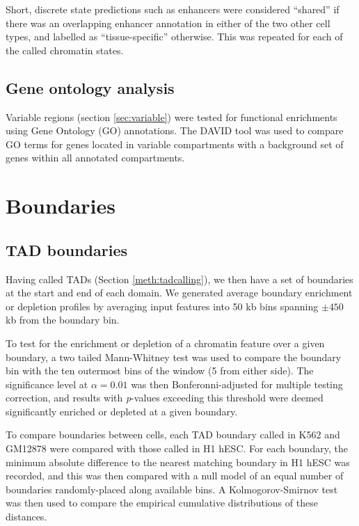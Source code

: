 \documentclass[a4paper,11pt,oneside]{book}
\begin{document}
Short, discrete state predictions such as enhancers were
considered ``shared'' if there was an overlapping enhancer annotation in
either of the two other cell types, and labelled as ``tissue-specific''
otherwise. This was repeated for each of the called chromatin states.

\subsection{Gene ontology analysis}

Variable regions (section \ref{sec:variable}) were tested for functional enrichments using Gene Ontology (GO) annotations.\cite{Ashburner2000} The DAVID tool\cite{Huang2008} was used to compare GO terms for genes located in variable compartments with a background set of genes within all annotated compartments.


\section{Boundaries}\label{boundaries}

\subsection{TAD boundaries}\label{meth:tadbounds}

Having called TADs (Section \ref{meth:tadcalling}), we then have a set of boundaries at the start and end of each domain. We generated average boundary enrichment or depletion profiles by averaging input features into 50 kb bins spanning $\pm450$ kb from the boundary bin.

To test for the enrichment or depletion of a chromatin feature over a
given boundary, a two tailed Mann-Whitney test was used to compare the
boundary bin with the ten outermost bins of the window (5 from either
side). The significance level at $\alpha = 0.01$ was then
Bonferonni-adjusted for multiple testing correction, and results with
\emph{p}-values exceeding this threshold were deemed significantly
enriched or depleted at a given boundary.

To compare boundaries between cells, each TAD boundary called in K562 and GM12878 were compared with those called in H1 hESC. For each boundary, the minimum absolute difference to the nearest matching boundary in H1 hESC was recorded, and this was then compared with a null model of an equal number of boundaries randomly-placed along available bins. A Kolmogorov-Smirnov test was then used to compare the empirical cumulative distributions of these distances.
\end{document}
